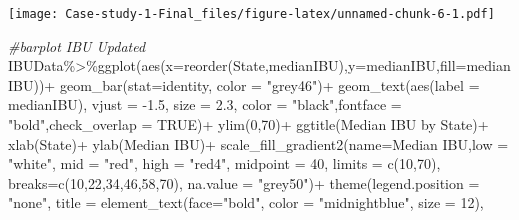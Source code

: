 \documentclass[
]{article}
\newenvironment{Shaded}{\begin{snugshade}}{\end{snugshade}}
\newcommand{\AttributeTok}[1]{\textcolor[rgb]{0.77,0.63,0.00}{#1}}
\newcommand{\CommentTok}[1]{\textcolor[rgb]{0.56,0.35,0.01}{\textit{#1}}}
\newcommand{\ConstantTok}[1]{\textcolor[rgb]{0.00,0.00,0.00}{#1}}
\newcommand{\DecValTok}[1]{\textcolor[rgb]{0.00,0.00,0.81}{#1}}
\newcommand{\FloatTok}[1]{\textcolor[rgb]{0.00,0.00,0.81}{#1}}
\newcommand{\FunctionTok}[1]{\textcolor[rgb]{0.00,0.00,0.00}{#1}}
\newcommand{\NormalTok}[1]{#1}
\newcommand{\SpecialCharTok}[1]{\textcolor[rgb]{0.00,0.00,0.00}{#1}}
\newcommand{\StringTok}[1]{\textcolor[rgb]{0.31,0.60,0.02}{#1}}
\begin{document}
\texttt{[image: Case-study-1-Final\_files/figure-latex/unnamed-chunk-6-1.pdf]}

\begin{Shaded}
\begin{Highlighting}[]
\CommentTok{\#barplot IBU Updated}
\NormalTok{IBUData}\SpecialCharTok{\%\textgreater{}\%}\FunctionTok{ggplot}\NormalTok{(}\FunctionTok{aes}\NormalTok{(}\AttributeTok{x=}\FunctionTok{reorder}\NormalTok{(State,medianIBU),}\AttributeTok{y=}\NormalTok{medianIBU,}\AttributeTok{fill=}\NormalTok{medianIBU))}\SpecialCharTok{+}
  \FunctionTok{geom\_bar}\NormalTok{(}\AttributeTok{stat=}\StringTok{\textquotesingle{}identity\textquotesingle{}}\NormalTok{, }\AttributeTok{color =} \StringTok{"grey46"}\NormalTok{)}\SpecialCharTok{+}
  \FunctionTok{geom\_text}\NormalTok{(}\FunctionTok{aes}\NormalTok{(}\AttributeTok{label  =}\NormalTok{ medianIBU), }\AttributeTok{vjust =} \SpecialCharTok{{-}}\FloatTok{1.5}\NormalTok{, }\AttributeTok{size =} \FloatTok{2.3}\NormalTok{, }\AttributeTok{color =} \StringTok{"black"}\NormalTok{,}\AttributeTok{fontface =}  \StringTok{"bold"}\NormalTok{,}\AttributeTok{check\_overlap =} \ConstantTok{TRUE}\NormalTok{)}\SpecialCharTok{+}
  \FunctionTok{ylim}\NormalTok{(}\DecValTok{0}\NormalTok{,}\DecValTok{70}\NormalTok{)}\SpecialCharTok{+}
  \FunctionTok{ggtitle}\NormalTok{(}\StringTok{\textquotesingle{}Median IBU by State\textquotesingle{}}\NormalTok{)}\SpecialCharTok{+}
  \FunctionTok{xlab}\NormalTok{(}\StringTok{\textquotesingle{}State\textquotesingle{}}\NormalTok{)}\SpecialCharTok{+}
  \FunctionTok{ylab}\NormalTok{(}\StringTok{\textquotesingle{}Median IBU\textquotesingle{}}\NormalTok{)}\SpecialCharTok{+}
  \FunctionTok{scale\_fill\_gradient2}\NormalTok{(}\AttributeTok{name=}\StringTok{\textquotesingle{}Median IBU\textquotesingle{}}\NormalTok{,}\AttributeTok{low =} \StringTok{"white"}\NormalTok{, }\AttributeTok{mid =} \StringTok{"red"}\NormalTok{, }\AttributeTok{high =} \StringTok{"red4"}\NormalTok{, }
                       \AttributeTok{midpoint =} \DecValTok{40}\NormalTok{, }\AttributeTok{limits =} \FunctionTok{c}\NormalTok{(}\DecValTok{10}\NormalTok{,}\DecValTok{70}\NormalTok{), }
                       \AttributeTok{breaks=}\FunctionTok{c}\NormalTok{(}\DecValTok{10}\NormalTok{,}\DecValTok{22}\NormalTok{,}\DecValTok{34}\NormalTok{,}\DecValTok{46}\NormalTok{,}\DecValTok{58}\NormalTok{,}\DecValTok{70}\NormalTok{), }\AttributeTok{na.value =} \StringTok{"grey50"}\NormalTok{)}\SpecialCharTok{+}
  \FunctionTok{theme}\NormalTok{(}\AttributeTok{legend.position =} \StringTok{"none"}\NormalTok{,}
        \AttributeTok{title =} \FunctionTok{element\_text}\NormalTok{(}\AttributeTok{face=}\StringTok{"bold"}\NormalTok{, }\AttributeTok{color =} \StringTok{"midnightblue"}\NormalTok{, }\AttributeTok{size =} \DecValTok{12}\NormalTok{),}

\end{Highlighting}
\end{Shaded}
\end{document}
